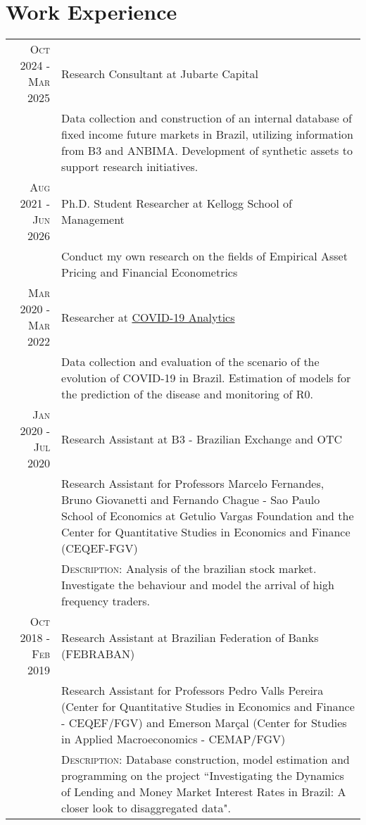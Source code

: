 \documentclass[a4paper,10pt]{article}
\begin{document}
\section{Work Experience}
\begin{tabular}{r|p{10.75cm}}
    \textsc{Oct 2024 - Mar 2025} & Research Consultant at Jubarte Capital \\
    & \footnotesize{Data collection and construction of an internal database of fixed income future markets in Brazil, utilizing information from B3 and ANBIMA. Development of synthetic assets to support research initiatives.} \\
    \textsc{Aug 2021 - Jun 2026} & Ph.D. Student Researcher at Kellogg School of Management \\
    & \footnotesize{Conduct my own research on the fields of Empirical Asset Pricing and Financial Econometrics} \\
    \textsc{Mar 2020 - Mar 2022} & Researcher at \href{https://covid19analytics.com.br/}{COVID-19 Analytics} \\
    &\footnotesize{Data collection and evaluation of the scenario of the evolution of COVID-19 in Brazil. Estimation of models for the prediction of the disease and monitoring of R0.} \\
    \textsc{Jan 2020 - Jul 2020} & Research Assistant at B3 - Brazilian Exchange and OTC \\
    &\footnotesize{Research Assistant for Professors Marcelo Fernandes, Bruno Giovanetti and Fernando Chague - Sao Paulo School of Economics at Getulio Vargas Foundation and the Center for Quantitative Studies in Economics and Finance (CEQEF-FGV)} \\
    &\footnotesize{\textsc{Description}: Analysis of the brazilian stock market. Investigate the behaviour and model the arrival of high frequency traders.} \\
    \textsc{Oct 2018 - Feb 2019} & Research Assistant at Brazilian Federation of Banks (FEBRABAN) \\
    &\footnotesize{Research Assistant for Professors Pedro Valls Pereira (Center for Quantitative Studies in Economics and Finance - CEQEF/FGV) and Emerson Marçal (Center for Studies in Applied Macroeconomics - CEMAP/FGV)}\\
    &\footnotesize{\textsc{Description}: Database construction, model estimation and programming on the project ``Investigating the Dynamics of Lending and Money Market Interest Rates in Brazil: A closer look to disaggregated data".}
\end{tabular}
\end{document}
